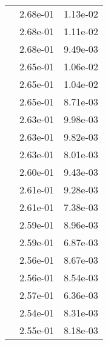 \begin{table}
\begin{tabular}{c|cc|}
\multicolumn{1}{|c|}{} & \multicolumn{1}{|c|}{  2.68e-01} & \multicolumn{1}{|c|}{  1.13e-02} \\ 
\multicolumn{1}{|c|}{} & \multicolumn{1}{|c|}{  2.68e-01} & \multicolumn{1}{|c|}{  1.11e-02} \\ 
\multicolumn{1}{|c|}{} & \multicolumn{1}{|c|}{  2.68e-01} & \multicolumn{1}{|c|}{  9.49e-03} \\ 
\multicolumn{1}{|c|}{} & \multicolumn{1}{|c|}{  2.65e-01} & \multicolumn{1}{|c|}{  1.06e-02} \\ 
\multicolumn{1}{|c|}{} & \multicolumn{1}{|c|}{  2.65e-01} & \multicolumn{1}{|c|}{  1.04e-02} \\ 
\multicolumn{1}{|c|}{} & \multicolumn{1}{|c|}{  2.65e-01} & \multicolumn{1}{|c|}{  8.71e-03} \\ 
\multicolumn{1}{|c|}{} & \multicolumn{1}{|c|}{  2.63e-01} & \multicolumn{1}{|c|}{  9.98e-03} \\ 
\multicolumn{1}{|c|}{} & \multicolumn{1}{|c|}{  2.63e-01} & \multicolumn{1}{|c|}{  9.82e-03} \\ 
\multicolumn{1}{|c|}{} & \multicolumn{1}{|c|}{  2.63e-01} & \multicolumn{1}{|c|}{  8.01e-03} \\ 
\multicolumn{1}{|c|}{} & \multicolumn{1}{|c|}{  2.60e-01} & \multicolumn{1}{|c|}{  9.43e-03} \\ 
\multicolumn{1}{|c|}{} & \multicolumn{1}{|c|}{  2.61e-01} & \multicolumn{1}{|c|}{  9.28e-03} \\ 
\multicolumn{1}{|c|}{} & \multicolumn{1}{|c|}{  2.61e-01} & \multicolumn{1}{|c|}{  7.38e-03} \\ 
\multicolumn{1}{|c|}{} & \multicolumn{1}{|c|}{  2.59e-01} & \multicolumn{1}{|c|}{  8.96e-03} \\ 
\multicolumn{1}{|c|}{} & \multicolumn{1}{|c|}{  2.59e-01} & \multicolumn{1}{|c|}{  6.87e-03} \\ 
\multicolumn{1}{|c|}{} & \multicolumn{1}{|c|}{  2.56e-01} & \multicolumn{1}{|c|}{  8.67e-03} \\ 
\multicolumn{1}{|c|}{} & \multicolumn{1}{|c|}{  2.56e-01} & \multicolumn{1}{|c|}{  8.54e-03} \\ 
\multicolumn{1}{|c|}{} & \multicolumn{1}{|c|}{  2.57e-01} & \multicolumn{1}{|c|}{  6.36e-03} \\ 
\multicolumn{1}{|c|}{} & \multicolumn{1}{|c|}{  2.54e-01} & \multicolumn{1}{|c|}{  8.31e-03} \\ 
\multicolumn{1}{|c|}{} & \multicolumn{1}{|c|}{  2.55e-01} & \multicolumn{1}{|c|}{  8.18e-03} \\ 

\end{tabular}
\end{table}
